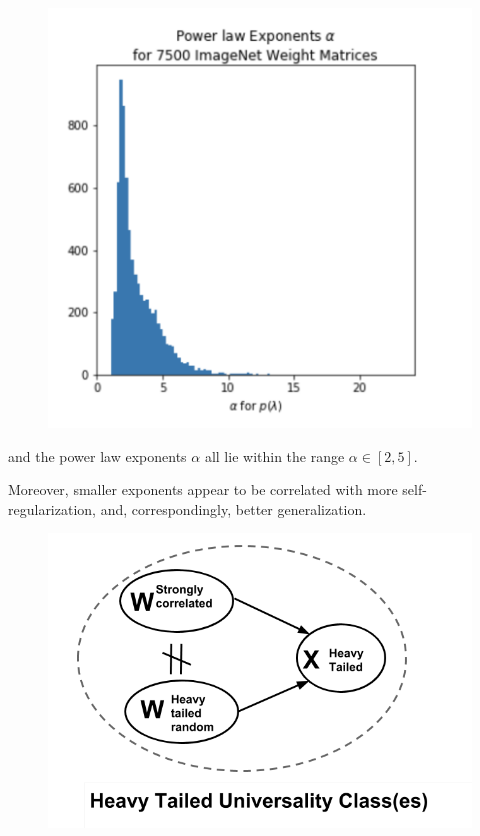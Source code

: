 \begin{figure}[!htb]
   \centering
   \includegraphics[scale=0.40]{img/power-law-histogram.png} 
   \caption{}
   \label{fig:power-law-histogram}
\end{figure}

and the power law exponents $\alpha$ all lie within the range $\alpha\in[2,5]$.


Moreover, smaller exponents appear to be correlated with more self-regularization, and, correspondingly, 
better generalization.


\begin{figure}[!htb]
   \centering
   \includegraphics[scale=0.40]{img/universality_classes.png} 
   \caption{}
   \label{fig:universality_diagram}
\end{figure}


